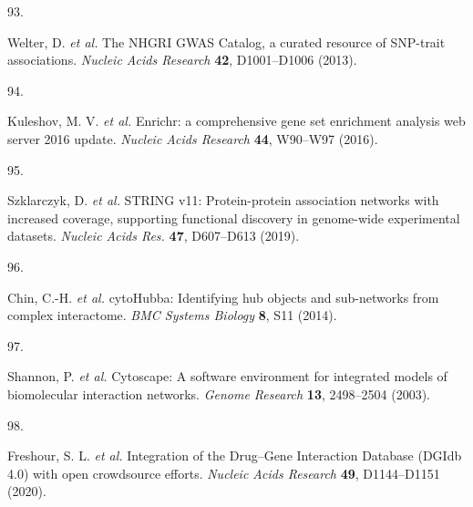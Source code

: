 \documentclass[
  11,
  a4paper,
]{article}
\newlength{\cslhangindent}
\newlength{\csllabelwidth}
\newlength{\cslentryspacingunit} %
\newenvironment{CSLReferences}[2] %
 {%
  \setlength{\parindent}{0pt}
  \ifodd #1
  \let\oldpar\par
  \def\par{\hangindent=\cslhangindent\oldpar}
  \fi
  \setlength{\parskip}{#2\cslentryspacingunit}
 }%
 {}
\newcommand{\CSLLeftMargin}[1]{\parbox[t]{\csllabelwidth}{#1}}
\newcommand{\CSLRightInline}[1]{\parbox[t]{\linewidth - \csllabelwidth}{#1}\break}
\begin{document}
\begin{CSLReferences}{0}{0}
\leavevmode{}%
\CSLLeftMargin{93. }%
\CSLRightInline{Welter, D. \emph{et al.} {The NHGRI GWAS Catalog, a
curated resource of SNP-trait associations}. \emph{Nucleic Acids
Research} \textbf{42}, D1001--D1006 (2013).}

\leavevmode{}%
\CSLLeftMargin{94. }%
\CSLRightInline{Kuleshov, M. V. \emph{et al.} {Enrichr: a comprehensive
gene set enrichment analysis web server 2016 update}. \emph{Nucleic
Acids Research} \textbf{44}, W90--W97 (2016).}

\leavevmode{}%
\CSLLeftMargin{95. }%
\CSLRightInline{Szklarczyk, D. \emph{et al.} {STRING} v11:
Protein-protein association networks with increased coverage, supporting
functional discovery in genome-wide experimental datasets. \emph{Nucleic
Acids Res.} \textbf{47}, D607--D613 (2019).}

\leavevmode{}%
\CSLLeftMargin{96. }%
\CSLRightInline{Chin, C.-H. \emph{et al.} {cytoHubba}: Identifying hub
objects and sub-networks from complex interactome. \emph{BMC Systems
Biology} \textbf{8}, S11 (2014).}

\leavevmode{}%
\CSLLeftMargin{97. }%
\CSLRightInline{Shannon, P. \emph{et al.} Cytoscape: A software
environment for integrated models of biomolecular interaction networks.
\emph{Genome Research} \textbf{13}, 2498--2504 (2003).}

\leavevmode{}%
\CSLLeftMargin{98. }%
\CSLRightInline{Freshour, S. L. \emph{et al.} {Integration of the
Drug--Gene Interaction Database (DGIdb 4.0) with open crowdsource
efforts}. \emph{Nucleic Acids Research} \textbf{49}, D1144--D1151
(2020).}

\end{CSLReferences}
\end{document}
